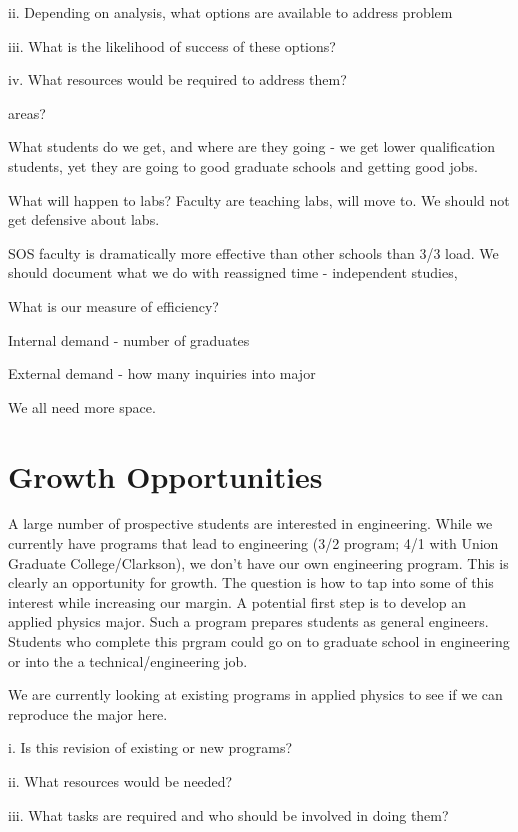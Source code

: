 \documentclass[12pt]{article}
\begin{document}
ii. Depending on analysis, what options are available to address problem

iii. What is the likelihood of success of these options?

iv. What resources would be required to address them?

areas?


What students do we get, and where are they going - we get lower qualification students, yet they are going to good graduate schools and getting good jobs.  

What will happen to labs?  Faculty are teaching labs, will move to.  We should not get defensive about labs.  

SOS faculty is dramatically more effective than other schools than 3/3 load.  We should document what we do with reassigned time - independent studies, 

What is our measure of efficiency?

Internal demand - number of graduates

External demand - how many inquiries into major

We all need more space.  


\section{Growth Opportunities}

A large number of prospective students are interested in engineering.  While we currently 
have programs that lead to engineering (3/2 program; 4/1 with Union Graduate College/Clarkson),
we don't have our own engineering program.  This is clearly an opportunity for growth.  The question is
how to tap into some of this interest while increasing our margin.  A potential first step is to develop
an applied physics major.  Such a program prepares students as general engineers.  Students who complete
this prgram could go on to graduate school in engineering or into the a technical/engineering job. 

We are currently looking at existing programs in applied physics to see if we can reproduce the 
major here.

i. Is this revision of existing or new programs?

ii. What resources would be needed?

iii. What tasks are required and who should be involved in doing them?
\end{document}
